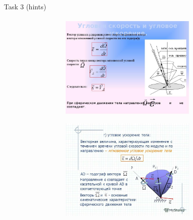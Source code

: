 \documentclass[aspectratio=169]{beamer}
\begin{document}
\begin{frame}[t]{Task 3 (hints)}
\framesubtitle{}
    \begin{figure}[H]
        \begin{subfigure}{0.59\textwidth}
            \centering\includegraphics[height=5cm,width=1\textwidth,keepaspectratio]{image10.png}
            \label{fig:image10}
        \end{subfigure}
        \begin{subfigure}{0.4\textwidth}
            \centering\includegraphics[height=5cm,width=1\textwidth,keepaspectratio]{image25.png}
            \label{fig:image25}
        \end{subfigure}
    
    \label{fig:}
    \end{figure}
\end{frame}
\end{document}
